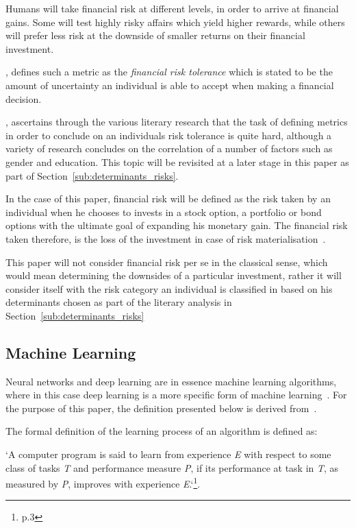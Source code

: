 \documentclass[12pt]{article}
\begin{document}
Humans will take financial risk at different levels, in order to arrive at financial gains. Some will test highly risky affairs which yield higher rewards, while others will prefer less risk at the downside of smaller returns on their financial investment.

\citet{financialRiskTolerance.pdf}, defines such a metric as the \emph{financial risk tolerance} which is stated to be the amount of uncertainty an individual is able to accept when making a financial decision.

\citet{financialRiskTolerance.pdf}, ascertains through the various literary research that the task of defining metrics in order to conclude on an individuals risk tolerance is quite hard, although a variety of research concludes on the correlation of a number of factors such as gender and education. This topic will be revisited at a later stage in this paper as part of Section~\ref{sub:determinants_risks}.

In the case of this paper, financial risk will be defined as the risk taken by an individual when he chooses to invests in a stock option, a portfolio or bond options with the ultimate goal of expanding his monetary gain. The financial risk taken therefore, is the loss of the investment in case of risk materialisation~\citep{finRisk}. 

This paper will not consider financial risk per se in the classical sense, which would mean determining the downsides of a particular investment, rather it will consider itself with the risk category an individual is classified in based on his determinants chosen as part of the literary analysis in Section~\ref{sub:determinants_risks}

\subsection{Machine Learning}
\label{sub:neural_networks}

Neural networks and deep learning are in essence machine learning algorithms, where in this case deep learning is a more specific form of machine learning~\citep{deeplearningbook}. For the purpose of this paper, the definition presented below is derived from~\citet{deeplearningbook}. 

The formal definition of the learning process of an algorithm is defined as: 
 
`A computer program is said to learn from experience \textit{E} with respect to some class of tasks \textit{T} and performance measure \textit{P}, if its performance at task in \textit{T}, as measured by \textit{P}, improves with experience \textit{E}.`\footnote{\citet{mitchel97} p.3}. 
\end{document}

